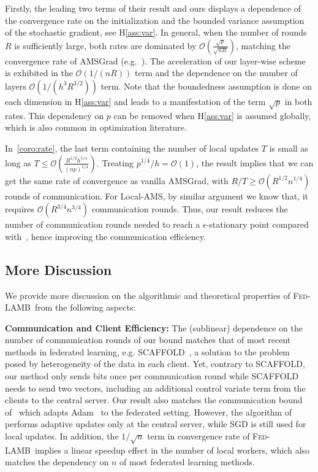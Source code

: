 \documentclass[11pt]{article}
\newcommand{\algo}{\textsc{Fed-LAMB}}
\begin{document}
Firstly, the leading two terms of their result and ours displays a dependence of the convergence rate on the initialization and the bounded variance assumption of the stochastic gradient, see H\ref{ass:var}. In general, when the number of rounds $R$ is sufficiently large, both rates are dominated by $\mathcal O(\frac{\sqrt p}{\sqrt{n R}})$, matching the convergence rate of AMSGrad (e.g.~\cite{Arxiv:Zhou_18}).
The acceleration of our layer-wise scheme is exhibited in the $\mathcal O(1/(n R))$ term and the dependence on the number of layers $\mathcal O(1/(h^3 R^{3/2}))$ term. Note that the boundedness assumption is done on each dimension in H\ref{ass:var} and leads to a manifestation of the term $\sqrt{p}$ in both rates. This dependency on $p$ can be removed when H\ref{ass:var} is assumed globally, which is also common in optimization literature.

In~\eqref{coro:rate}, the last term containing the number of local updates $T$ is small as long as $T\leq \mathcal O(\frac{R^{1/2}h^{5/4}}{(np)^{1/4}})$. 
Treating $p^{1/4}/h=\mathcal O(1)$, the result implies that we can get the same rate of convergence as vanilla AMSGrad, with $R/T\geq \mathcal{O}(R^{1/2}n^{1/4})$ rounds of communication. For Local-AMS, by similar argument we know that, it requires $\mathcal O(R^{3/4}n^{3/4})$ communication rounds. Thus, our result reduces the number of communication rounds needed to reach a $\epsilon$-stationary point compared with~\cite{chen2020toward}, hence improving the communication efficiency.


\subsection{More Discussion}

We provide more discussion on the algorithmic and theoretical properties of \algo\ from the following aspects:

\medskip
\textbf{Communication and Client Efficiency:} The (sublinear) dependence on the number of communication rounds of our bound matches that of most recent methods in federated learning, e.g. SCAFFOLD~\citep{karimireddy2019scaffold}, a solution to the problem posed by heterogeneity of the data in each client. Yet, contrary to SCAFFOLD, our method only sends bits once per communication round while SCAFFOLD needs to send two vectors, including an additional control variate term  from the clients to the central server. Our result also matches the communication bound of~\cite{reddi2020adaptive} which adapts Adam~\citep{KB15} to the federated setting. However, the algorithm of \cite{reddi2020adaptive} performs adaptive updates only at the central server, while SGD is still used for local updates. In addition, the $1/\sqrt n$ term in convergence rate of \algo\ implies a linear speedup effect in the number of local workers, which also matches the dependency on $n$ of most federated learning methods. 
\end{document}

